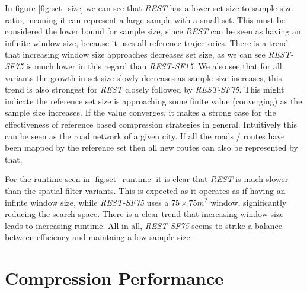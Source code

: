 In figure \ref{fig:set_size} we can see that \textit{REST} has a lower set size to sample size ratio, meaning it can represent a large sample with a small set. This must be considered the lower bound for sample size, since \textit{REST} can be seen as having an infinite window size, because it uses all reference trajectories. There is a trend that increasing window size approaches decreases set size, as we can see \textit{REST-SF75} is much lower in this regard than \textit{REST-SF15}. We also see that for all variants the growth in set size slowly decreases as sample size increases, this trend is also strongest for \textit{REST} closely followed by \textit{REST-SF75}. This might indicate the reference set size is approaching some finite value (converging) as the sample size increases. If the value converges, it makes a strong case for the effectiveness of reference based compression strategies in general. Intuitively this can be seen as the road network of a given city. If all the roads / routes have been mapped by the reference set then all new routes can also be represented by that.

For the runtime seen in \ref{fig:set_runtime} it is clear that \textit{REST} is much slower than the spatial filter variants. This is expected as it operates as if having an infinte window size, while \textit{REST-SF75} uses a $75\times75m^2$ window, significantly reducing the search space. There is a clear trend that increasing window size leads to increasing runtime. All in all, \textit{REST-SF75} seems to strike a balance between efficiency and maintaing a low sample size.
\section{Compression Performance}

